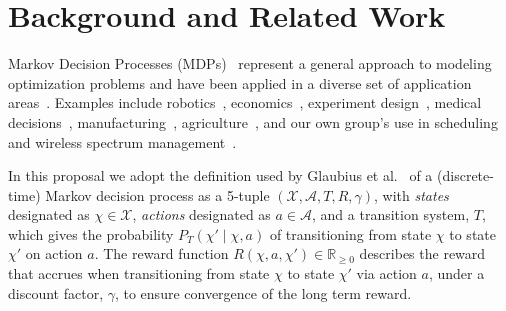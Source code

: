 \section{Background and Related Work}
\label{sec:background}




Markov Decision Processes (MDPs)~\cite{puterman} represent a general approach
to modeling optimization problems and have been applied in a diverse set of
application areas~\cite{White93}. Examples include robotics~\cite{ab10}, 
economics~\cite{bs98}, experiment design~\cite{kb85},
medical decisions~\cite{ahsr10}, manufacturing~\cite{yyl04},
agriculture~\cite{Kristensen03},
and our own group's use in scheduling~\cite{gtsg08,tggs10}
and wireless spectrum management~\cite{mgc16}.

In this proposal we adopt the definition used by Glaubius et al.~\cite{gtsg08}
of a (discrete-time) Markov decision process as a 5-tuple
$(\mathcal{X}, \mathcal{A}, T, R, \gamma)$, with \emph{states} designated
as $\chi \in \mathcal{X}$, \emph{actions} designated as $a \in \mathcal{A}$,
and a transition system, $T$, which gives the probability
$P_T (\chi' \mid \chi, a)$ of transitioning from state $\chi$ to
state $\chi'$ on action $a$.
The reward function $R(\chi, a, \chi') \in \mathbb R_{\ge 0}$ describes the
reward that accrues when transitioning from state $\chi$ to
state $\chi'$ via action $a$, under a discount factor, $\gamma$,
to ensure convergence of the long term reward.

